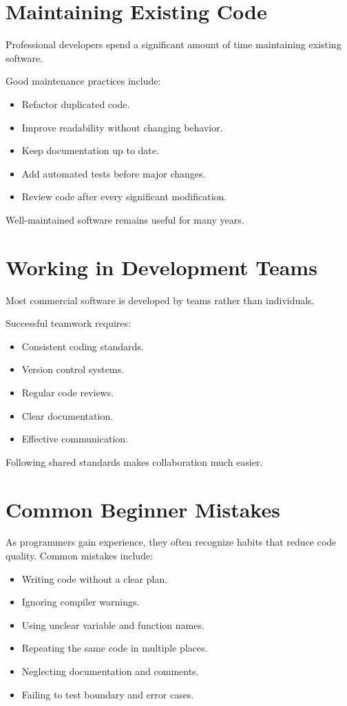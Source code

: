 \documentclass[12pt,openany]{book}
\begin{document}
\section{Maintaining Existing Code}

Professional developers spend a significant amount of time maintaining existing software.

Good maintenance practices include:

\begin{itemize}
    \item Refactor duplicated code.
    \item Improve readability without changing behavior.
    \item Keep documentation up to date.
    \item Add automated tests before major changes.
    \item Review code after every significant modification.
\end{itemize}

Well-maintained software remains useful for many years.

\section{Working in Development Teams}

Most commercial software is developed by teams rather than individuals.

Successful teamwork requires:

\begin{itemize}
    \item Consistent coding standards.
    \item Version control systems.
    \item Regular code reviews.
    \item Clear documentation.
    \item Effective communication.
\end{itemize}

Following shared standards makes collaboration much easier.
\section{Common Beginner Mistakes}

As programmers gain experience, they often recognize habits that reduce code quality. Common mistakes include:

\begin{itemize}
    \item Writing code without a clear plan.
    \item Ignoring compiler warnings.
    \item Using unclear variable and function names.
    \item Repeating the same code in multiple places.
    \item Neglecting documentation and comments.
    \item Failing to test boundary and error cases.
\end{itemize}
\end{document}
